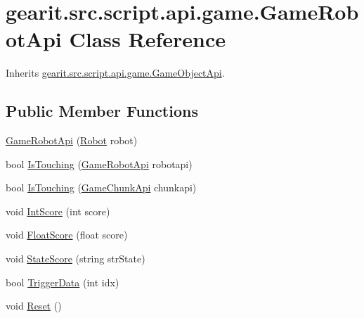 \hypertarget{classgearit_1_1src_1_1script_1_1api_1_1game_1_1_game_robot_api}{\section{gearit.\+src.\+script.\+api.\+game.\+Game\+Robot\+Api Class Reference}
\label{classgearit_1_1src_1_1script_1_1api_1_1game_1_1_game_robot_api}
}


Inherits \hyperlink{classgearit_1_1src_1_1script_1_1api_1_1game_1_1_game_object_api}{gearit.\+src.\+script.\+api.\+game.\+Game\+Object\+Api}.

\subsection*{Public Member Functions}
\begin{DoxyCompactItemize}
\item 
\hyperlink{classgearit_1_1src_1_1script_1_1api_1_1game_1_1_game_robot_api_ad4c6da66227671b132a2790ab0c8914f}{Game\+Robot\+Api} (\hyperlink{classgearit_1_1src_1_1robot_1_1_robot}{Robot} robot)
\item 
bool \hyperlink{classgearit_1_1src_1_1script_1_1api_1_1game_1_1_game_robot_api_a85463989e09c84731f08e46d75fff5cf}{Is\+Touching} (\hyperlink{classgearit_1_1src_1_1script_1_1api_1_1game_1_1_game_robot_api}{Game\+Robot\+Api} robotapi)
\item 
bool \hyperlink{classgearit_1_1src_1_1script_1_1api_1_1game_1_1_game_robot_api_aee841f5dca6757d0082123594282d855}{Is\+Touching} (\hyperlink{classgearit_1_1src_1_1script_1_1api_1_1game_1_1_game_chunk_api}{Game\+Chunk\+Api} chunkapi)
\item 
void \hyperlink{classgearit_1_1src_1_1script_1_1api_1_1game_1_1_game_robot_api_a8b35868df0684f9a94857aa64d98910e}{Int\+Score} (int score)
\item 
void \hyperlink{classgearit_1_1src_1_1script_1_1api_1_1game_1_1_game_robot_api_a1ce65eb1905abcc979b171b2add13841}{Float\+Score} (float score)
\item 
void \hyperlink{classgearit_1_1src_1_1script_1_1api_1_1game_1_1_game_robot_api_a92ba643ccf905ea4ca4addbf666a7d59}{State\+Score} (string str\+State)
\item 
bool \hyperlink{classgearit_1_1src_1_1script_1_1api_1_1game_1_1_game_robot_api_ab43d61fd18d020babacef35f0ce3f303}{Trigger\+Data} (int idx)
\item 
void \hyperlink{classgearit_1_1src_1_1script_1_1api_1_1game_1_1_game_robot_api_a17e00313f4dedcf8f5eb9b5412fc8d81}{Reset} ()
\end{DoxyCompactItemize}
